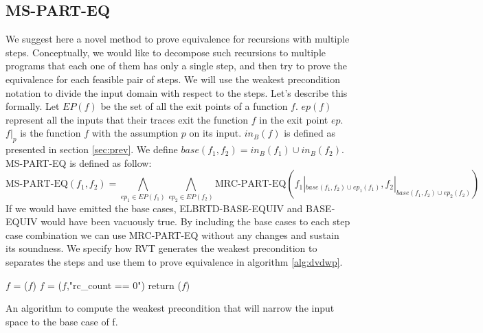 \subsection{MS-PART-EQ}
We suggest here a novel method to prove equivalence for recursions with multiple steps. Conceptually, we would like to decompose such recursions to multiple programs that each one of them has only a single step, and then try to prove the equivalence for each feasible pair of steps. We will use the weakest precondition notation to divide the input domain with respect to the steps. Let's describe this formally. Let $EP(f)$ be the set of all the exit points of a function $f$. $ep(f)$ represent all the inputs that their traces exit the function $f$ in the exit point $ep$. $f|_p$ is the function $f$ with the assumption $p$ on its input. $in_B(f)$ is defined as presented in section \ref{sec:prev}. We define $base(f_1,f_2)=in_B(f_1) \cup in_B(f_2)$. MS-PART-EQ is defined as follow:
\begin{equation}
  \text{MS-PART-EQ}(f_1,f_2) = \bigwedge_{ep_1\in EP(f_1)}\bigwedge_{ep_2\in EP(f_2)}\text{MRC-PART-EQ}(f_1|_{base(f_1,f_2) \cup ep_1(f_1)},f_2|_{base(f_1,f_2) \cup ep_2(f_2)})
\end{equation}
If we would have emitted the base cases, ELBRTD-BASE-EQUIV and BASE-EQUIV would have been vacuously true. By including the base cases to each step case combination we can use MRC-PART-EQ without any changes and sustain its soundness. We specify how RVT generates the weakest precondition to separates the steps and use them to prove equivalence in algorithm \ref{alg:dvdwp}.
\noindent
\begin{algorithm}
\begin{minipage}{\linewidth}
\begin{algorithmic}[1]
	\State $f$ = ($f$)
    \State $f$ = ($f$,"rc\_count == 0")
    \State return ($f$)
	\EndFunction
\end{algorithmic}
\end{minipage}
\caption{An algorithm to compute the weakest precondition that will narrow the input space to the base case of f.}
\label{alg:WPForBase}
\end{algorithm}
